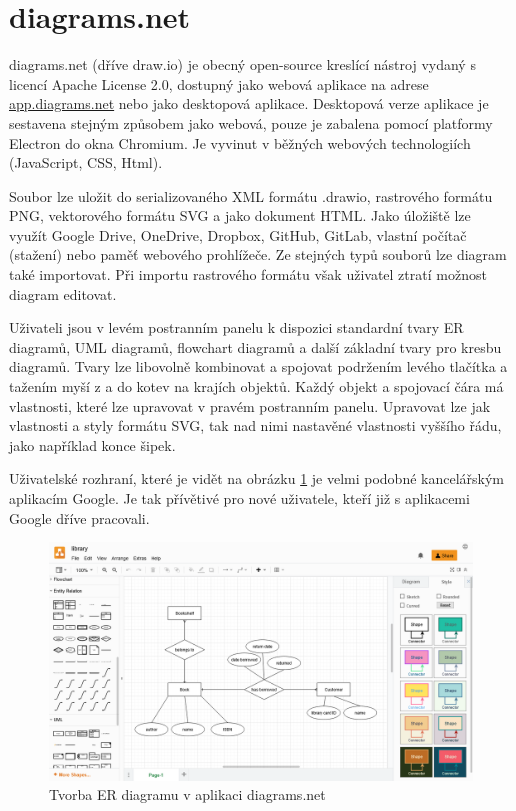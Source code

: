 \section{diagrams.net}

diagrams.net (dříve draw.io) je obecný open-source kreslící nástroj vydaný s
licencí Apache License 2.0, dostupný jako webová aplikace na adrese
\url{app.diagrams.net} nebo jako desktopová aplikace. Desktopová verze aplikace
je sestavena stejným způsobem jako webová, pouze je zabalena pomocí platformy
Electron do okna Chromium. Je vyvinut v běžných we\-bo\-vých tech\-no\-lo\-gi\-ích (Java\-Script,
CSS, Html).

Soubor lze uložit do serializovaného XML formátu .drawio, rastrového formátu
PNG, vektorového formátu SVG a jako dokument HTML. Jako úložiště lze využít
Google Drive, OneDrive, Dropbox, GitHub, GitLab, vlastní počítač (stažení) nebo
paměť webového prohlížeče. Ze stejných typů souborů lze diagram také importovat.
Při importu rastrového formátu však uživatel ztratí možnost diagram editovat.

Uživateli jsou v levém postranním panelu k dispozici standardní tvary ER
diagramů, UML diagramů, flowchart diagramů a další základní tvary pro kresbu
diagramů. Tvary lze libovolně kombinovat a spojovat podržením levého tlačítka a
tažením myší z a do kotev na krajích objektů. Každý objekt a spojovací čára má
vlastnosti, které lze upravovat v pravém postranním panelu. Upravovat lze jak
vlastnosti a styly formátu SVG, tak nad nimi nastavěné vlastnosti vyššího řádu,
jako například konce šipek.

Uživatelské rozhraní, které je vidět na obrázku \ref{fig:diagrams.net} je velmi
podobné kancelářským aplikacím Google. Je tak přívětivé pro nové uživatele,
kteří již s aplikacemi Google dříve pracovali.

\begin{figure}
  \centering
  \includegraphics[width=\textwidth]{../img/diagrams.net.png}
  \caption{Tvorba ER diagramu v aplikaci diagrams.net}
  \label{fig:diagrams.net}
\end{figure}

